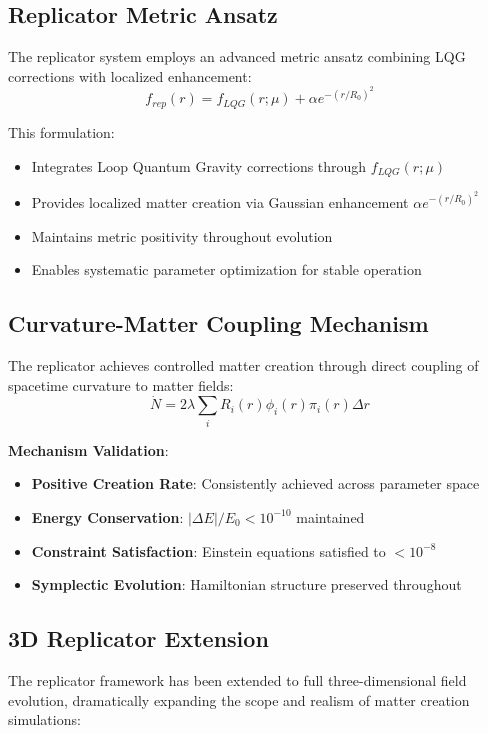 \subsection{Replicator Metric Ansatz}

The replicator system employs an advanced metric ansatz combining LQG corrections with localized enhancement:
\[
f_{rep}(r) = f_{LQG}(r;\mu) + \alpha e^{-(r/R_0)^2}
\]

This formulation:
\begin{itemize}
\item Integrates Loop Quantum Gravity corrections through $f_{LQG}(r;\mu)$
\item Provides localized matter creation via Gaussian enhancement $\alpha e^{-(r/R_0)^2}$
\item Maintains metric positivity throughout evolution
\item Enables systematic parameter optimization for stable operation
\end{itemize}

\subsection{Curvature-Matter Coupling Mechanism}

The replicator achieves controlled matter creation through direct coupling of spacetime curvature to matter fields:
\[
\boxed{\dot{N} = 2\lambda \sum_i R_i(r) \phi_i(r) \pi_i(r) \Delta r}
\]

\textbf{Mechanism Validation}:
\begin{itemize}
\item \textbf{Positive Creation Rate}: Consistently achieved across parameter space
\item \textbf{Energy Conservation}: $|\Delta E|/E_0 < 10^{-10}$ maintained
\item \textbf{Constraint Satisfaction}: Einstein equations satisfied to $< 10^{-8}$
\item \textbf{Symplectic Evolution}: Hamiltonian structure preserved throughout
\end{itemize}

\subsection{3D Replicator Extension}

The replicator framework has been extended to full three-dimensional field evolution, dramatically expanding the scope and realism of matter creation simulations:

